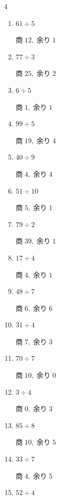 \begin{multicols}{4}
\begin{enumerate}
  \item $61 \div 5$

        $商\; 12,\; 余り\; 1$

  \item $77 \div 3$

        $商\; 25,\; 余り\; 2$

  \item $6 \div 5$

        $商\; 1,\; 余り\; 1$

  \item $99 \div 5$

        $商\; 19,\; 余り\; 4$

  \item $40 \div 9$

        $商\; 4,\; 余り\; 4$

  \item $51 \div 10$

        $商\; 5,\; 余り\; 1$

  \item $79 \div 2$

        $商\; 39,\; 余り\; 1$

  \item $17 \div 4$

        $商\; 4,\; 余り\; 1$

  \item $48 \div 7$

        $商\; 6,\; 余り\; 6$

\columnbreak %

\resetques

  \item $31 \div 4$

        $商\; 7,\; 余り\; 3$

  \item $70 \div 7$

        $商\; 10,\; 余り\; 0$

  \item $3 \div 4$

        $商\; 0,\; 余り\; 3$

  \item $85 \div 8$

        $商\; 10,\; 余り\; 5$

  \item $33 \div 7$

        $商\; 4,\; 余り\; 5$

  \item $52 \div 4$


\end{enumerate}
\end{multicols}
